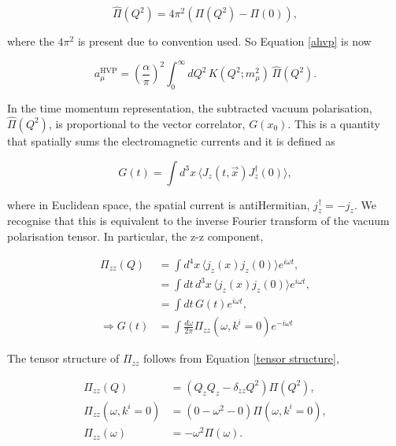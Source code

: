 \documentclass{article}
\numberwithin{equation}{section} %
\begin{document}
\begin{equation}
\hat{\Pi}(Q^2) = 4\pi^2(\Pi(Q^2) - \Pi(0)),
\end{equation}

\noindent where the $4\pi^2$ is present due to convention used. So Equation \ref{ahvp} is now 

\begin{equation}
a_\mu^\mathrm{HVP} = \left(\frac{\alpha}{\pi}\right)^2 \int_0^\infty dQ^2 \, K(Q^2;m_\mu^2) \,\hat{\Pi}(Q^2).
\end{equation}

In the time momentum representation, the subtracted vacuum polarisation, $\hat{\Pi}(Q^2)$, is proportional to the vector correlator, $G(x_0)$. This is a quantity that spatially sums the electromagnetic currents and it is defined as

\begin{equation}
G(t) = \int d^3x \, \langle J_z(t,\vec{x})J_z^\dag(0)\rangle,
\end{equation}

\noindent where in Euclidean space, the spatial current is antiHermitian, $j^\dag_z=-j_z$\cite{vector}. We recognise that this is equivalent to the inverse Fourier transform of the vacuum polarisation tensor. In particular, the z-z component,

\begin{equation}
\begin{split}
\Pi_{zz}(Q) &= \int d^4x \, \langle j_z(x) j_z(0)\rangle e^{i\omega t},\\
&= \int dt\,d^3x \, \langle j_z(x) j_z(0)\rangle e^{i\omega t},\\
&= \int dt \, G(t) e^{i\omega t},\\
\Rightarrow G(t) &= \int \frac{d\omega}{2\pi} \Pi_{zz}(\omega,k^i=0)e^{-i\omega t}
\end{split}
\label{G and Pi}
\end{equation}

\noindent The tensor structure of $\Pi_{zz}$ follows from Equation \ref{tensor structure},

\begin{equation}
\begin{split}
\Pi_{zz}(Q) &=\left(Q_z Q_z - \delta_{zz}Q^2 \right)\Pi(Q^2),\\
\Pi_{zz}(\omega,k^i=0) &=\left(0 - \omega^2 - 0 \right)\Pi(\omega,k^i=0),\\
\Pi_{zz}(\omega) &= -\omega^2\Pi(\omega).
\end{split}
\end{equation}
\end{document}
